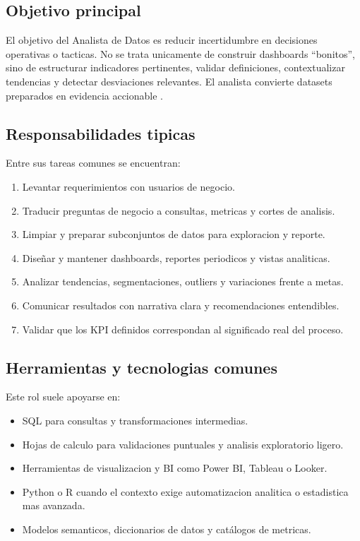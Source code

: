 \documentclass[12pt]{article}
\begin{document}
\subsection{Objetivo principal}
El objetivo del Analista de Datos es reducir incertidumbre en decisiones operativas o tacticas. No se trata unicamente de construir dashboards ``bonitos'', sino de estructurar indicadores pertinentes, validar definiciones, contextualizar tendencias y detectar desviaciones relevantes. El analista convierte datasets preparados en evidencia accionable \cite{ibm_modern_team}.

\subsection{Responsabilidades tipicas}
Entre sus tareas comunes se encuentran:
\begin{enumerate}[label=\textbf{A\arabic*.}, leftmargin=*]
\item Levantar requerimientos con usuarios de negocio.
\item Traducir preguntas de negocio a consultas, metricas y cortes de analisis.
\item Limpiar y preparar subconjuntos de datos para exploracion y reporte.
\item Diseñar y mantener dashboards, reportes periodicos y vistas analiticas.
\item Analizar tendencias, segmentaciones, outliers y variaciones frente a metas.
\item Comunicar resultados con narrativa clara y recomendaciones entendibles.
\item Validar que los KPI definidos correspondan al significado real del proceso.
\end{enumerate}

\subsection{Herramientas y tecnologias comunes}
Este rol suele apoyarse en:
\begin{itemize}[leftmargin=*]
\item SQL para consultas y transformaciones intermedias.
\item Hojas de calculo para validaciones puntuales y analisis exploratorio ligero.
\item Herramientas de visualizacion y BI como Power BI, Tableau o Looker.
\item Python o R cuando el contexto exige automatizacion analitica o estadistica mas avanzada.
\item Modelos semanticos, diccionarios de datos y catálogos de metricas.
\end{itemize}
\end{document}
